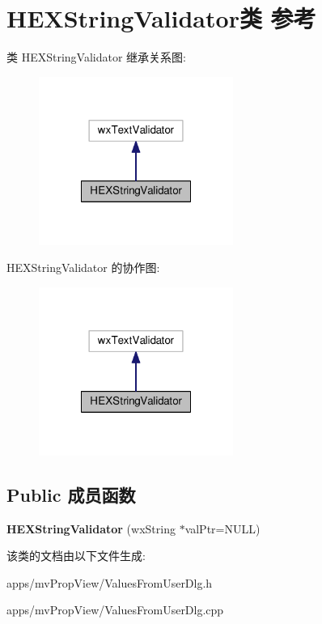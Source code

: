 \hypertarget{class_h_e_x_string_validator}{\section{H\+E\+X\+String\+Validator类 参考}
\label{class_h_e_x_string_validator}
}


类 H\+E\+X\+String\+Validator 继承关系图\+:
\nopagebreak
\begin{figure}[H]
\begin{center}
\leavevmode
\includegraphics[width=180pt]{class_h_e_x_string_validator__inherit__graph}
\end{center}
\end{figure}


H\+E\+X\+String\+Validator 的协作图\+:
\nopagebreak
\begin{figure}[H]
\begin{center}
\leavevmode
\includegraphics[width=180pt]{class_h_e_x_string_validator__coll__graph}
\end{center}
\end{figure}
\subsection*{Public 成员函数}
\begin{DoxyCompactItemize}
\item 
\hypertarget{class_h_e_x_string_validator_abc1bc18d69904d34569dfecd3516c124}{{\bfseries H\+E\+X\+String\+Validator} (wx\+String $\ast$val\+Ptr=N\+U\+L\+L)}\label{class_h_e_x_string_validator_abc1bc18d69904d34569dfecd3516c124}

\end{DoxyCompactItemize}


该类的文档由以下文件生成\+:\begin{DoxyCompactItemize}
\item 
apps/mv\+Prop\+View/Values\+From\+User\+Dlg.\+h\item 
apps/mv\+Prop\+View/Values\+From\+User\+Dlg.\+cpp\end{DoxyCompactItemize}
